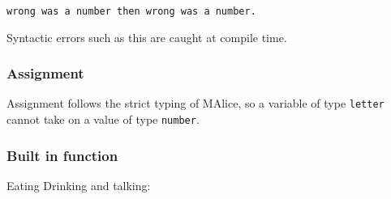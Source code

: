 \documentclass[a4wide, 10pt]{article}
\newcommand{\tab}{\hspace*{2em}}
\begin{document}
\texttt{\tab wrong was a number then wrong was a number.} 

Syntactic errors such as this are caught at compile time.

\subsubsection{Assignment}
Assignment follows the strict typing of MAlice, so a variable of type 
\texttt{letter} cannot take on a value of type \texttt{number}.

\subsubsection{Built in function}
Eating Drinking and talking: 

\end{document}

